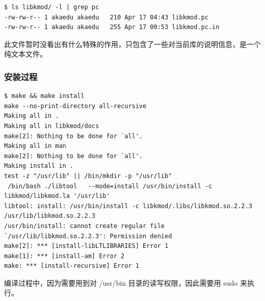 \documentclass[11pt,a4paper]{article}
\begin{document}
{\begin{shaded}\begin{verbatim}
$ ls libkmod/ -l | grep pc
-rw-rw-r-- 1 akaedu akaedu   210 Apr 17 04:43 libkmod.pc
-rw-rw-r-- 1 akaedu akaedu   255 Apr 17 00:53 libkmod.pc.in
\end{verbatim}\end{shaded}}
此文件暂时没看出有什么特殊的作用，只包含了一些对当前库的说明信息，是一个纯文本文件。

\subsubsection{安装过程}

{\begin{shaded}\begin{verbatim}
$ make && make install
make --no-print-directory all-recursive
Making all in .
Making all in libkmod/docs
make[2]: Nothing to be done for `all'.
Making all in man
make[2]: Nothing to be done for `all'.
Making install in .
test -z "/usr/lib" || /bin/mkdir -p "/usr/lib"
 /bin/bash ./libtool   --mode=install /usr/bin/install -c   libkmod/libkmod.la '/usr/lib'
libtool: install: /usr/bin/install -c libkmod/.libs/libkmod.so.2.2.3 /usr/lib/libkmod.so.2.2.3
/usr/bin/install: cannot create regular file `/usr/lib/libkmod.so.2.2.3': Permission denied
make[2]: *** [install-libLTLIBRARIES] Error 1
make[1]: *** [install-am] Error 2
make: *** [install-recursive] Error 1
\end{verbatim}\end{shaded}}
编译过程中，因为需要用到对 /usr/bin 目录的读写权限，因此需要用 sudo
来执行。
\end{document}
